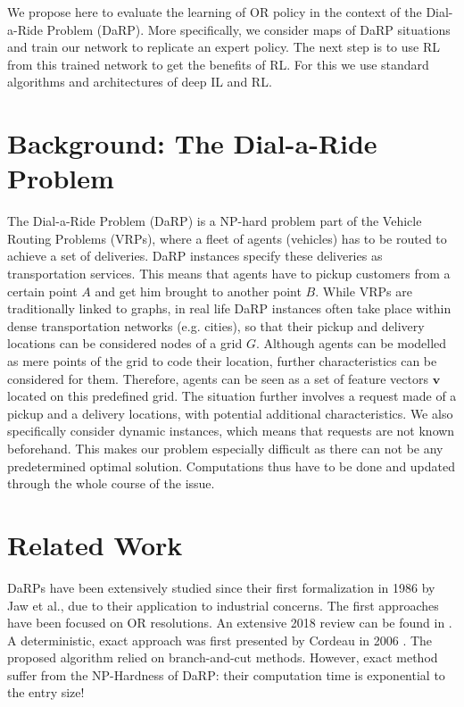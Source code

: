 \documentclass{article}
\begin{document}

We propose here to evaluate the learning of OR policy in the context of the Dial-a-Ride Problem (DaRP). More specifically, we consider maps of DaRP situations and train our network to replicate an expert policy. The next step is to use RL from this trained network to get the benefits of RL. For this we use standard algorithms and architectures of deep IL and RL.

\section{Background: The Dial-a-Ride Problem}

The Dial-a-Ride Problem (DaRP) is a NP-hard problem part of the Vehicle Routing Problems (VRPs), where a fleet of agents (vehicles) has to be routed to achieve a set of deliveries. DaRP instances specify these deliveries as transportation services.
This means that agents have to pickup customers from a certain point $A$ and get him brought to another point $B$. 
While VRPs are traditionally linked to graphs, in real life DaRP instances often take place within dense transportation networks (e.g. cities), so that their pickup and delivery locations can be considered nodes of a grid $G$.
Although agents can be modelled as mere points of the grid to code their location, further characteristics can be considered for them.
Therefore, agents can be seen as a set of feature vectors $\textbf{v}$ located on this predefined grid. 
The situation further involves a request made of a pickup and a delivery locations, with potential additional characteristics.
We also specifically consider dynamic instances, 
which means that requests are not known beforehand.
This makes our problem especially difficult as there can not be any predetermined optimal solution.
Computations thus have to be done and updated through the whole course of the issue.  


\section{Related Work}


DaRPs have been extensively studied since their first formalization in 1986 by Jaw et al.\cite{jaw1986heuristic}, due to their application to industrial concerns.
The first approaches have been focused on OR resolutions.
An extensive 2018 review can be found in \cite{ho2018survey}.
A deterministic, exact approach was first presented by Cordeau in 2006 \cite{cordeau2006branch}.
The proposed algorithm relied on branch-and-cut methods.
However, exact method suffer from the NP-Hardness of DaRP: their computation time is exponential to the entry size!
\end{document}
